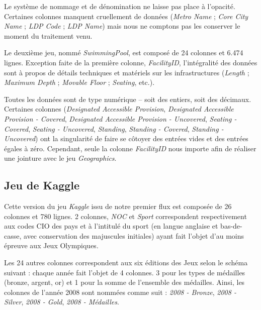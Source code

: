 \documentclass[hidelinks, 12pt]{report}
\begin{document}
Le système de nommage et de dénomination ne laisse pas place à l'opacité. Certaines colonnes manquent cruellement de données (\textit{Metro Name} ; \textit{Core City Name} ; \textit{LDP Code} ; \textit{LDP Name}) mais nous ne comptons pas les conserver le moment du traitement venu.
\newline

Le deuxième jeu, nommé \textit{SwimmingPool}, est composé de 24 colonnes et 6.474 lignes. Exception faite de la première colonne, \textit{FacilityID}, l'intégralité des données sont à propos de détails techniques et matériels sur les infrastructures (\textit{Length} ; \textit{Maximum Depth} ; \textit{Movable Floor} ; \textit{Seating}, etc.).

Toutes les données sont de type numérique -- soit des entiers, soit des décimaux. Certaines colonnes (\textit{Designated Accessible Provision}, \textit{Designated Accessible Provision - Covered}, \textit{Designated Accessible Provision - Uncovered}, \textit{Seating - Covered}, \textit{Seating - Uncovered}, \textit{Standing}, \textit{Standing - Covered}, \textit{Standing - Uncovered}) ont la singularité de faire se côtoyer des entrées vides et des entrées égales à zéro. Cependant, seule la colonne \emph{FacilityID} nous importe afin de réaliser une jointure avec le jeu \textit{Geographics}.





%





\subsection{Jeu de Kaggle}

Cette version du jeu \textit{Kaggle} issu de notre premier flux est composée de 26 colonnes et 780 lignes. 2 colonnes, \textit{NOC} et \textit{Sport} correspondent respectivement aux codes CIO des pays et à l'intitulé du sport (en langue anglaise et bas-de-casse, avec conservation des majuscules initiales) ayant fait l'objet d'au moins épreuve aux Jeux Olympiques.

Les 24 autres colonnes correspondent aux six éditions des Jeux selon le schéma suivant : chaque année fait l'objet de 4 colonnes. 3 pour les types de médailles (bronze, argent, or) et 1 pour la somme de l'ensemble des médailles. Ainsi, les colonnes de l'année 2008 sont nommées comme suit : \textit{2008 - Bronze}, \textit{2008 - Silver}, \textit{2008 - Gold}, \textit{2008 - Médailles}.
\end{document}
